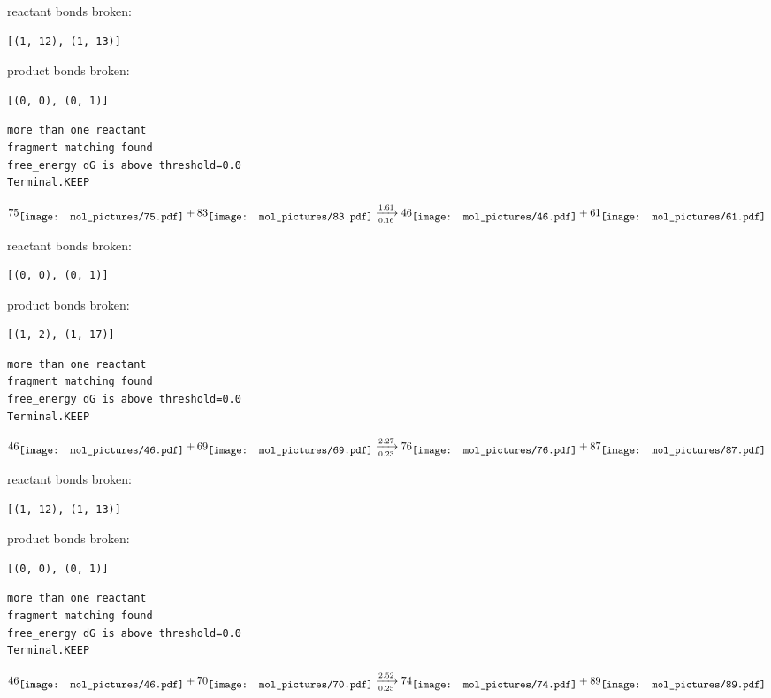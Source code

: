 \documentclass{article}
\begin{document}
reactant bonds broken:\begin{verbatim}
[(1, 12), (1, 13)]
\end{verbatim}
product bonds broken:\begin{verbatim}
[(0, 0), (0, 1)]
\end{verbatim}




\vspace{1cm}
\begin{verbatim}
more than one reactant
fragment matching found
free_energy dG is above threshold=0.0
Terminal.KEEP
\end{verbatim}
$$
75
\raisebox{-.5\height}{\texttt{[image: mol\_pictures/75.pdf]}}
+
83
\raisebox{-.5\height}{\texttt{[image: mol\_pictures/83.pdf]}}
\xrightarrow[0.16]{1.61}
46
\raisebox{-.5\height}{\texttt{[image: mol\_pictures/46.pdf]}}
+
61
\raisebox{-.5\height}{\texttt{[image: mol\_pictures/61.pdf]}}
$$


reactant bonds broken:\begin{verbatim}
[(0, 0), (0, 1)]
\end{verbatim}
product bonds broken:\begin{verbatim}
[(1, 2), (1, 17)]
\end{verbatim}




\vspace{1cm}
\begin{verbatim}
more than one reactant
fragment matching found
free_energy dG is above threshold=0.0
Terminal.KEEP
\end{verbatim}
$$
46
\raisebox{-.5\height}{\texttt{[image: mol\_pictures/46.pdf]}}
+
69
\raisebox{-.5\height}{\texttt{[image: mol\_pictures/69.pdf]}}
\xrightarrow[0.23]{2.27}
76
\raisebox{-.5\height}{\texttt{[image: mol\_pictures/76.pdf]}}
+
87
\raisebox{-.5\height}{\texttt{[image: mol\_pictures/87.pdf]}}
$$


reactant bonds broken:\begin{verbatim}
[(1, 12), (1, 13)]
\end{verbatim}
product bonds broken:\begin{verbatim}
[(0, 0), (0, 1)]
\end{verbatim}




\vspace{1cm}
\begin{verbatim}
more than one reactant
fragment matching found
free_energy dG is above threshold=0.0
Terminal.KEEP
\end{verbatim}
$$
46
\raisebox{-.5\height}{\texttt{[image: mol\_pictures/46.pdf]}}
+
70
\raisebox{-.5\height}{\texttt{[image: mol\_pictures/70.pdf]}}
\xrightarrow[0.25]{2.52}
74
\raisebox{-.5\height}{\texttt{[image: mol\_pictures/74.pdf]}}
+
89
\raisebox{-.5\height}{\texttt{[image: mol\_pictures/89.pdf]}}
$$
\end{document}

